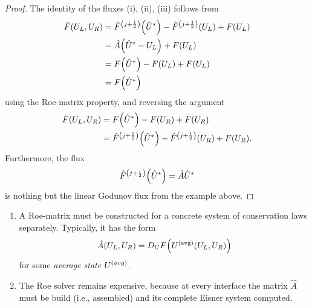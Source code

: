 \begin{proof}
	The identity of the fluxes (i), (ii), (iii) follows from
	\begin{align*}
		\tilde{F}\parentheses*{U_L, U_R} &= \hat{F}^{\parentheses*{j + \frac{1}{2}}}\parentheses*{\hat{U}^*} - \hat{F}^{\parentheses*{j + \frac{1}{2}}}\parentheses*{U_L} + F\parentheses*{U_L}\\
		&= \hat{A}\parentheses*{\hat{U}^* - U_L} + F\parentheses*{U_L}\\
		&= F\parentheses*{\hat{U}^*} - F\parentheses*{U_L} + F\parentheses*{U_L}\\
		&= F\parentheses*{\hat{U}^*}
	\end{align*}
	using the Roe-matrix property, and reversing the argument
	\begin{align*}
		\tilde{F}\parentheses*{U_L, U_R} &= F\parentheses*{\hat{U}^*} - F\parentheses*{U_R} + F\parentheses*{U_R}\\
		&= \hat{F}^{\parentheses*{j + \frac{1}{2}}}\parentheses*{\hat{U}^*} - \hat{F}^{\parentheses*{j + \frac{1}{2}}}\parentheses*{U_R} + F\parentheses*{U_R}.
	\end{align*}
	Furthermore, the flux
	\[
		\hat{F}^{\parentheses*{j + \frac{1}{2}}}\parentheses*{\hat{U}^*} = \hat{A}\hat{U}^*
	\]
	is nothing but the linear Godunov flux from the example above.
\end{proof}

\begin{remark}
	\begin{enumerate}
		\item A Roe-matrix must be constructed for a concrete system of conservation laws separately.
		Typically, it has the form
		\[
			\hat{A}\parentheses*{U_L, U_R} = D_U F\parentheses*{U^{\parentheses*{\text{avg}}}\parentheses*{U_L, U_R}}
		\]
		for some \emph{average state} \(U^{\parentheses*{avg}}\).
		\item The Roe solver remains expensive, because at every interface the matrix \(\hat{A}\) must be build (i.e., assembled) and its complete Eisner system computed.
	\end{enumerate}
\end{remark}

